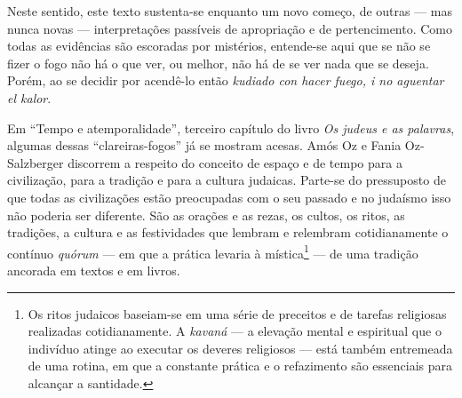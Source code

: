 Neste sentido, este texto sustenta-se enquanto um novo começo, de outras
--- mas nunca novas --- interpretações passíveis de apropriação e de
pertencimento. Como todas as evidências são escoradas por mistérios,
entende-se aqui que se não se fizer o fogo não há o que ver, ou melhor,
não há de se ver nada que se deseja. Porém, ao se decidir por acendê-lo
então \emph{kudiado con hacer fuego, i no aguentar el kalor}.

\begin{center}\end{center}

\noindent{}Em ``Tempo e atemporalidade'', terceiro capítulo do livro \emph{Os
judeus e as palavras}, algumas dessas ``clareiras-fogos'' já se mostram
acesas. Amós Oz e Fania Oz-Salzberger discorrem a respeito do conceito
de espaço e de tempo para a civilização, para a tradição e para a
cultura judaicas. Parte-se do pressuposto de que todas as civilizações
estão preocupadas com o seu passado e no judaísmo isso não poderia ser
diferente. São as orações e as rezas, os cultos, os ritos, as tradições,
a cultura e as festividades que lembram e relembram cotidianamente o
contínuo \emph{quórum} --- em que a prática levaria à mística\footnote{Os
  ritos judaicos baseiam-se em uma série de preceitos e de tarefas
  religiosas realizadas cotidianamente. A \emph{kavaná} --- a elevação
  mental e espiritual que o indivíduo atinge ao executar os deveres
  religiosos --- está também entremeada de uma rotina, em que a
  constante prática e o refazimento são essenciais para alcançar a
  santidade.} --- de uma tradição ancorada em textos e em livros.

